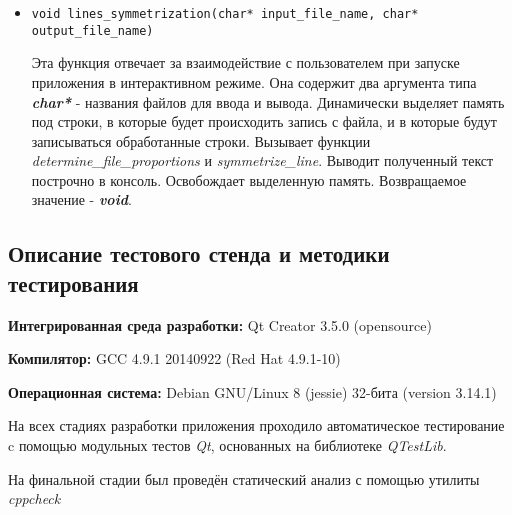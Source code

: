 \documentclass[12pt,a4paper]{report}
\begin{document}
\begin{enumerate}
\begin{itemize}
\item \verb-void lines_symmetrization(char* input_file_name, char* output_file_name)-

Эта функция отвечает за взаимодействие с пользователем при запуске приложения в интерактивном режиме. Она содержит два аргумента типа \textbf{\textit{char*} }- названия файлов для ввода и вывода.  Динамически выделяет память под строки, в которые будет происходить запись с файла, и в которые будут записываться обработанные строки. Вызывает функции \textit{determine\_file\_proportions} и \textit{symmetrize\_line}. Выводит полученный текст построчно в консоль. Освобождает выделенную память. Возвращаемое значение - \textit{\textbf{void}}.
\end{itemize}


\end{enumerate}
\subsection{Описание тестового стенда и методики тестирования}

\begin{flushleft}
\textbf{Интегрированная среда разработки:} Qt Creator 3.5.0 (opensource)

\textbf{Компилятор:} GCC 4.9.1 20140922 (Red Hat 4.9.1-10)

\textbf{Операционная система:} Debian GNU/Linux 8 (jessie) 32-бита (version 3.14.1)
\end{flushleft}

На всех стадиях разработки приложения проходило автоматическое тестирование c помощью модульных тестов \textit{Qt}, основанных на библиотеке  \textit{QTestLib}.

На финальной стадии был проведён статический анализ с помощью утилиты \textit{cppcheck}%
\end{document}
